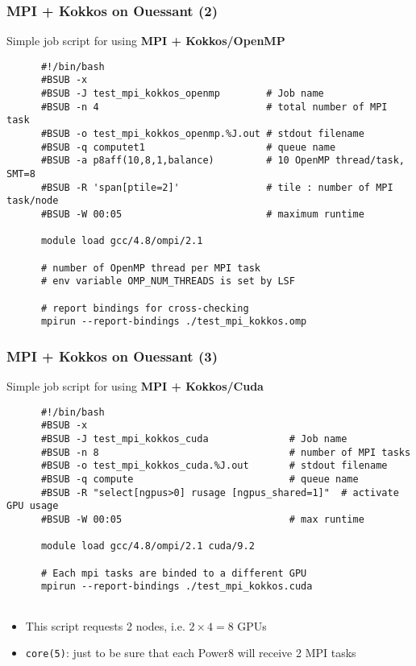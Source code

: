 \begin{frame}[fragile=singleslide]
  \frametitle{MPI + Kokkos on Ouessant (2)}

  {\Large Simple job script for using \textbf{MPI + Kokkos/OpenMP}}

  {\small
    \begin{verbatim}
      #!/bin/bash
      #BSUB -x
      #BSUB -J test_mpi_kokkos_openmp        # Job name
      #BSUB -n 4                             # total number of MPI task
      #BSUB -o test_mpi_kokkos_openmp.%J.out # stdout filename
      #BSUB -q computet1                     # queue name
      #BSUB -a p8aff(10,8,1,balance)         # 10 OpenMP thread/task, SMT=8
      #BSUB -R 'span[ptile=2]'               # tile : number of MPI task/node
      #BSUB -W 00:05                         # maximum runtime
            
      module load gcc/4.8/ompi/2.1
      
      # number of OpenMP thread per MPI task
      # env variable OMP_NUM_THREADS is set by LSF
      
      # report bindings for cross-checking
      mpirun --report-bindings ./test_mpi_kokkos.omp
    \end{verbatim}
  }
\end{frame}

\begin{frame}[fragile=singleslide]
  \frametitle{MPI + Kokkos on Ouessant (3)}

  {\Large Simple job script for using \textbf{MPI + Kokkos/Cuda}}

  {\small
    \begin{verbatim}
      #!/bin/bash
      #BSUB -x
      #BSUB -J test_mpi_kokkos_cuda              # Job name
      #BSUB -n 8                                 # number of MPI tasks
      #BSUB -o test_mpi_kokkos_cuda.%J.out       # stdout filename
      #BSUB -q compute                           # queue name
      #BSUB -R "select[ngpus>0] rusage [ngpus_shared=1]"  # activate GPU usage
      #BSUB -W 00:05                             # max runtime
            
      module load gcc/4.8/ompi/2.1 cuda/9.2
      
      # Each mpi tasks are binded to a different GPU
      mpirun --report-bindings ./test_mpi_kokkos.cuda
      
    \end{verbatim}
  }
  \begin{itemize}
    \item This script requests 2 nodes, i.e. $2\times4=8$ GPUs
  \item \texttt{core(5)}: just to be sure that each Power8 will receive 2 MPI tasks
  \end{itemize}
\end{frame}

